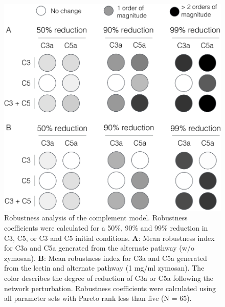 \documentclass[12pt]{article}
\begin{document}
\begin{figure}[h]
\centering
\includegraphics[width=1.0\textwidth]{./figs/Figure5_RobustnessAnalysis_v4.pdf}
\caption{Robustness analysis of the complement model.
Robustness coefficients were calculated for a 50\%, 90\% and 99\% reduction in C3, C5, or C3 and C5 initial conditions.
\textbf{A}: Mean robustness index for C3a and C5a generated from the alternate pathway (w/o zymosan).
\textbf{B}: Mean robustness index for C3a and C5a generated from the lectin and alternate pathway (1 mg/ml zymosan).
The color describes the degree of reduction of C3a or C5a following the network perturbation.
Robustness coefficients were calculated using all parameter sets with Pareto rank less than five (N = 65).
}\label{fig-robustness-analysis}
\end{figure}


\end{document}

